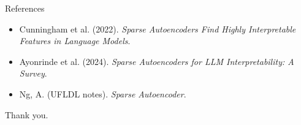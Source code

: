 \documentclass[aspectratio=169,12pt]{beamer}
\begin{document}
\begin{frame}{References}
\footnotesize
\begin{itemize}
  \item Cunningham et al. (2022). \emph{Sparse Autoencoders Find Highly Interpretable Features in Language Models}.
  \item Ayonrinde et al. (2024). \emph{Sparse Autoencoders for LLM Interpretability: A Survey}.
  \item Ng, A. (UFLDL notes). \emph{Sparse Autoencoder}.
\end{itemize}
\end{frame}

\begin{frame}[plain]
\centering
\Large Thank you.
\end{frame}
\end{document}
